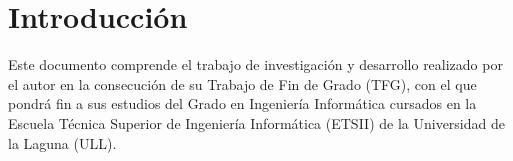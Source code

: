 %
%

\chapter*{Introducción}

Este documento comprende el trabajo de investigación y desarrollo realizado por el autor en la consecución de su Trabajo de Fin de Grado (TFG), con el que pondrá fin a sus estudios del Grado en Ingeniería Informática cursados en la Escuela Técnica Superior de Ingeniería Informática (ETSII) de la Universidad de la Laguna (ULL).
